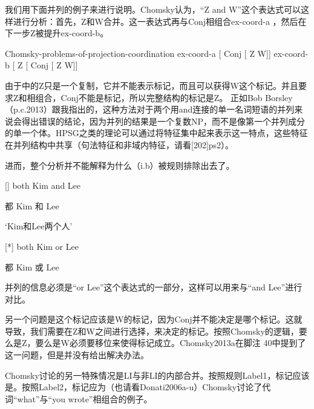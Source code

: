 我们用下面并列的例子来进行说明。Chomsky认为，“Z  and W”这个表达式可以这样进行分析：首先，Z和W合并。这一表达式再与Conj相组合ex-coord-a ，然后在下一步Z被提升ex-coord-b。













Chomsky-problems-of-projection-coordination
ex-coord-a [ Conj [ Z W]]
ex-coord-b [ Z [ Conj [ Z W]]

由于中的Z只是一个复制，它并不能表示标记，而且可以获得W这个标记。并且要求Z和相组合，Conj不能是标记，所以完整结构的标记是Z。 
正如Bob Borsley（p.c.2013）跟我指出的，这种方法对于两个用and连接的单一名词短语的并列来说会得出错误的结论，因为并列的结果是一个复数NP，而不是像第一个并列成分的单一个体。HPSG之类的理论可以通过将特征集中起来表示这一特点，这些特征在并列结构中共享（句法特征和非域内特征，请看[202]ps2）。

进而，整个分析并不能解释为什么（i.b）被规则排除出去了。


[]
both Kim and Lee

都 Kim 和 Lee

`Kim和Lee两个人'

[*]
both Kim or Lee

都 Kim 或 Lee



并列的信息必须是“or Lee”这个表达式的一部分，这样可以用来与“and Lee”进行对比。

另一个问题是这个标记应该是W的标记，因为Conj并不能决定是哪个标记。这就导致，我们需要在Z和W之间进行选择，来决定的标记。按照Chomsky的逻辑，要么是Z，要么是W必须要移位来使得标记成立。Chomsky2013a在脚注 40中提到了这一问题，但是并没有给出解决办法。





























Chomsky讨论的另一特殊情况是LI与非LI的内部合并。按照规则Label1，标记应该是。按照Label2，标记应为（也请看Donati2006a-u）Chomsky讨论了代词“what”与“you wrote”相组合的例子。





